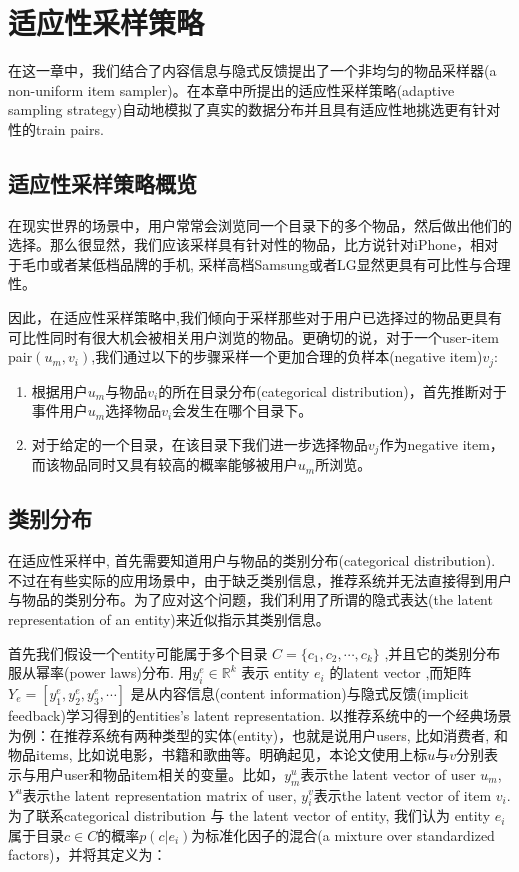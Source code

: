 \section{适应性采样策略}
在这一章中，我们结合了内容信息与隐式反馈提出了一个非均匀的物品采样器(a non-uniform item sampler)。在本章中所提出的适应性采样策略(adaptive sampling strategy)自动地模拟了真实的数据分布并且具有适应性地挑选更有针对性的train pairs.


\subsection{适应性采样策略概览}
在现实世界的场景中，用户常常会浏览同一个目录下的多个物品，然后做出他们的选择。那么很显然，我们应该采样具有针对性的物品，比方说针对iPhone，相对于毛巾或者某低档品牌的手机, 采样高档Samsung或者LG显然更具有可比性与合理性。

因此，在适应性采样策略中,我们倾向于采样那些对于用户已选择过的物品更具有可比性同时有很大机会被相关用户浏览的物品。更确切的说，对于一个user-item pair$\left(u_m,v_i\right)$,我们通过以下的步骤采样一个更加合理的负样本(negative item)$v_j$:
\begin{enumerate}
	\item 根据用户$u_m$与物品$v_i$的所在目录分布(categorical distribution)，首先推断对于事件用户$u_m$选择物品$v_i$会发生在哪个目录下。
	\item 
	对于给定的一个目录，在该目录下我们进一步选择物品$v_j$作为negative item，而该物品同时又具有较高的概率能够被用户$u_m$所浏览。
\end{enumerate}




\subsection{类别分布}
在适应性采样中, 首先需要知道用户与物品的类别分布(categorical distribution). 不过在有些实际的应用场景中，由于缺乏类别信息，推荐系统并无法直接得到用户与物品的类别分布。为了应对这个问题，我们利用了所谓的隐式表达(the latent representation of an entity)来近似指示其类别信息。

首先我们假设一个entity可能属于多个目录 $C = \{c_1,c_2,\cdots,c_k\}$ ,并且它的类别分布服从幂率(power laws)分布\cite{rendle2014improving}. 用$y_i^e \in \mathbb{R}^k$ 表示 entity $e_i$ 的latent vector ,而矩阵 $Y_e = \left[y_1^e,y_2^e,y_3^e,\cdots\right]$ 是从内容信息(content information)与隐式反馈(implicit feedback)学习得到的entities's latent representation. 以推荐系统中的一个经典场景为例：在推荐系统有两种类型的实体(entity)，也就是说用户users, 比如消费者, 和物品items, 比如说电影，书籍和歌曲等。明确起见，本论文使用上标$u$与$v$分别表示与用户user和物品item相关的变量。比如，$y^u_m$表示the latent vector of user $u_m$,$Y^u$表示the latent representation matrix of user, $y_i^v$表示the latent vector of item $v_i$.为了联系categorical distribution 与 the latent vector of entity, 我们认为 entity $e_i$属于目录$c\in C$的概率$p\left(c|e_i\right)$为标准化因子的混合(a mixture over standardized factors)，并将其定义为：

